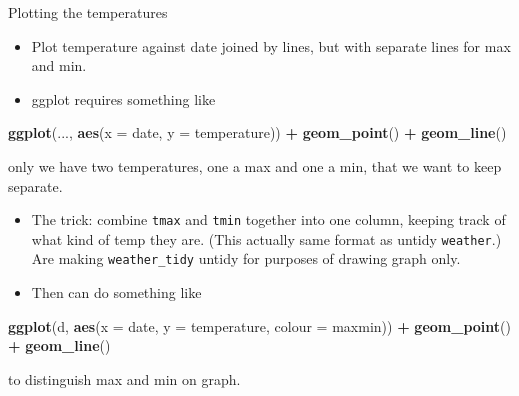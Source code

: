 \documentclass[ignorenonframetext,]{beamer}
\newenvironment{Shaded}{\begin{snugshade}}{\end{snugshade}}
\newcommand{\DataTypeTok}[1]{\textcolor[rgb]{0.13,0.29,0.53}{#1}}
\newcommand{\KeywordTok}[1]{\textcolor[rgb]{0.13,0.29,0.53}{\textbf{#1}}}
\newcommand{\NormalTok}[1]{#1}
\newcommand{\OperatorTok}[1]{\textcolor[rgb]{0.81,0.36,0.00}{\textbf{#1}}}
\newcommand{\StringTok}[1]{\textcolor[rgb]{0.31,0.60,0.02}{#1}}
\providecommand{\tightlist}{%
  \setlength{\itemsep}{0pt}\setlength{\parskip}{0pt}}
\begin{document}
\begin{frame}[fragile]{Plotting the temperatures}
\protect\hypertarget{plotting-the-temperatures}{}

\begin{itemize}
\tightlist
\item
  Plot temperature against date joined by lines, but with separate lines
  for max and min.
\item
  ggplot requires something like
\end{itemize}

\begin{Shaded}
\begin{Highlighting}[]
\KeywordTok{ggplot}\NormalTok{(..., }\KeywordTok{aes}\NormalTok{(}\DataTypeTok{x =}\NormalTok{ date, }\DataTypeTok{y =}\NormalTok{ temperature)) }\OperatorTok{+}\StringTok{ }\KeywordTok{geom_point}\NormalTok{() }\OperatorTok{+}\StringTok{ }\KeywordTok{geom_line}\NormalTok{()}
\end{Highlighting}
\end{Shaded}

only we have two temperatures, one a max and one a min, that we want to
keep separate.

\begin{itemize}
\tightlist
\item
  The trick: combine \texttt{tmax} and \texttt{tmin} together into one
  column, keeping track of what kind of temp they are. (This actually
  same format as untidy \texttt{weather}.) Are making
  \texttt{weather\_tidy} untidy for purposes of drawing graph only.
\item
  Then can do something like
\end{itemize}

\begin{Shaded}
\begin{Highlighting}[]
\KeywordTok{ggplot}\NormalTok{(d, }\KeywordTok{aes}\NormalTok{(}\DataTypeTok{x =}\NormalTok{ date, }\DataTypeTok{y =}\NormalTok{ temperature, }\DataTypeTok{colour =}\NormalTok{ maxmin)) }\OperatorTok{+}\StringTok{ }\KeywordTok{geom_point}\NormalTok{() }\OperatorTok{+}\StringTok{ }\KeywordTok{geom_line}\NormalTok{()}
\end{Highlighting}
\end{Shaded}

to distinguish max and min on graph.

\end{frame}
\end{document}
